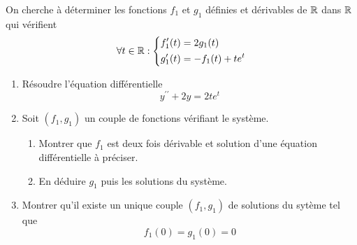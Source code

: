 On cherche à déterminer les fonctions $f_1$ et $g_1$ définies et dérivables de $\mathbb{R}$ dans $\mathbb{R}$ qui vérifient 
\begin{displaymath}
\forall t\in \mathbb{R} : 
\left\{
\begin{aligned}
f_1^\prime(t) &= 2g_1(t) \\
g_1^\prime(t) &= -f_1(t) + te^t
\end{aligned}
\right .
\end{displaymath}
\begin{enumerate}
\item Résoudre l'équation différentielle
\begin{displaymath}
y^{\prime\prime} + 2y = 2te^t
\end{displaymath}

\item  Soit $(f_1,g_1)$ un couple de fonctions vérifiant le système.
\begin{enumerate}
\item Montrer que $f_1$ est deux fois dérivable et solution d'une équation différentielle à préciser.
\item En déduire $g_1$ puis les solutions du système.
\end{enumerate}
\item Montrer qu'il existe un unique couple $(f_1,g_1)$ de solutions du sytème tel que
\begin{displaymath}
f_1(0)=g_1(0)=0
\end{displaymath}
\end{enumerate}